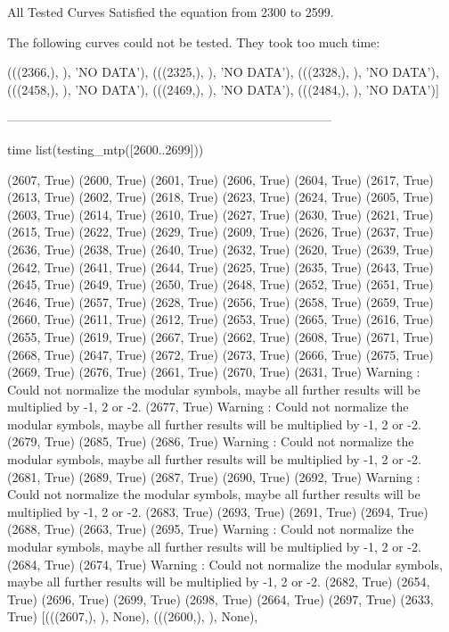 All Tested Curves Satisfied the equation from 2300 to 2599.

The following curves could not be tested.
They took too much time:

 (((2366,), {}), 'NO DATA'),
 (((2325,), {}), 'NO DATA'),
 (((2328,), {}), 'NO DATA'),
 (((2458,), {}), 'NO DATA'),
 (((2469,), {}), 'NO DATA'),
(((2484,), {}), 'NO DATA')]

 ------------------------------------------------------------------------------
 

 time list(testing_mtp([2600..2699]))

 (2607, True)
(2600, True)
(2601, True)
(2606, True)
(2604, True)
(2617, True)
(2613, True)
(2602, True)
(2618, True)
(2623, True)
(2624, True)
(2605, True)
(2603, True)
(2614, True)
(2610, True)
(2627, True)
(2630, True)
(2621, True)
(2615, True)
(2622, True)
(2629, True)
(2609, True)
(2626, True)
(2637, True)
(2636, True)
(2638, True)
(2640, True)
(2632, True)
(2620, True)
(2639, True)
(2642, True)
(2641, True)
(2644, True)
(2625, True)
(2635, True)
(2643, True)
(2645, True)
(2649, True)
(2650, True)
(2648, True)
(2652, True)
(2651, True)
(2646, True)
(2657, True)
(2628, True)
(2656, True)
(2658, True)
(2659, True)
(2660, True)
(2611, True)
(2612, True)
(2653, True)
(2665, True)
(2616, True)
(2655, True)
(2619, True)
(2667, True)
(2662, True)
(2608, True)
(2671, True)
(2668, True)
(2647, True)
(2672, True)
(2673, True)
(2666, True)
(2675, True)
(2669, True)
(2676, True)
(2661, True)
(2670, True)
(2631, True)
Warning : Could not normalize the modular symbols, maybe all further results will be multiplied by -1, 2 or -2.
(2677, True)
Warning : Could not normalize the modular symbols, maybe all further results will be multiplied by -1, 2 or -2.
(2679, True)
(2685, True)
(2686, True)
Warning : Could not normalize the modular symbols, maybe all further results will be multiplied by -1, 2 or -2.
(2681, True)
(2689, True)
(2687, True)
(2690, True)
(2692, True)
Warning : Could not normalize the modular symbols, maybe all further results will be multiplied by -1, 2 or -2.
(2683, True)
(2693, True)
(2691, True)
(2694, True)
(2688, True)
(2663, True)
(2695, True)
Warning : Could not normalize the modular symbols, maybe all further results will be multiplied by -1, 2 or -2.
(2684, True)
(2674, True)
Warning : Could not normalize the modular symbols, maybe all further results will be multiplied by -1, 2 or -2.
(2682, True)
(2654, True)
(2696, True)
(2699, True)
(2698, True)
(2664, True)
(2697, True)
(2633, True)
[(((2607,), {}), None),
 (((2600,), {}), None),
